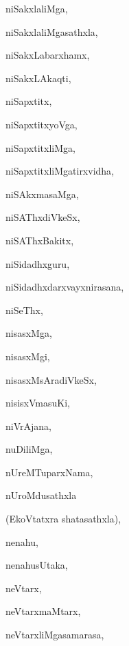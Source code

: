 \begin{multicols}{3}
{\noindent
{niSakxlaliMga}, \pageref{niSakxlaliMga}

\noindent
{niSakxlaliMgasathxla}, \pageref{niSakxlaliMgasathxla}

\noindent
{niSakxLabarxhamx}, \pageref{niSakxLabarxhamx}

\noindent
{niSakxLAkaqti}, \pageref{niSakxLAkaqti}

\noindent
{niSapxtitx}, \pageref{niSapxtitx}

\noindent
{niSapxtitxyoVga}, \pageref{niSapxtitxyoVga}

\noindent
{niSapxtitxliMga}, \pageref{niSapxtitxliMga}

\noindent
{niSapxtitxliMgatirxvidha}, \pageref{niSapxtitxliMgatirxvidha}

\noindent
{niSAkxmasaMga}, \pageref{niSAkxmasaMga}

\noindent
{niSAThxdiVkeSx}, \pageref{niSAThxdiVkeSx}

\noindent
{niSAThxBakitx}, \pageref{niSAThxBakitx}

\noindent
{niSidadhxguru}, \pageref{niSidadhxguru}

\noindent
{niSidadhxdarxvayxnirasana}, \pageref{niSidadhxdarxvayxnirasana}

\noindent
{niSeThx}, \pageref{niSeThx}

\noindent
{nisasxMga}, \pageref{nisasxMga}

\noindent
{nisasxMgi}, \pageref{nisasxMgi}

\noindent
{nisasxMsAradiVkeSx}, \pageref{nisasxMsAradiVkeSx}

\noindent
{nisisxVmasuKi}, \pageref{nisisxVmasuKi}

\noindent
{niVrAjana}, \pageref{niVrAjana}

\noindent
{nuDiliMga}, \pageref{nuDiliMga}

\noindent
{nUreMTuparxNama}, \pageref{nUreMTuparxNama}

\noindent
{nUroMdusathxla}

\noindent
\qquad (EkoVtatxra shatasathxla), \pageref{nUroMdusathxlaEkoVtatxra shatasathxla}

\noindent
{nenahu}, \pageref{nenahu}

\noindent
{nenahusUtaka}, \pageref{nenahusUtaka}

\noindent
{neVtarx}, \pageref{neVtarx}

\noindent
{neVtarxmaMtarx}, \pageref{neVtarxmaMtarx}

\noindent
{neVtarxliMgasamarasa}, \pageref{neVtarxliMgasamarasa}

}
\end{multicols}
